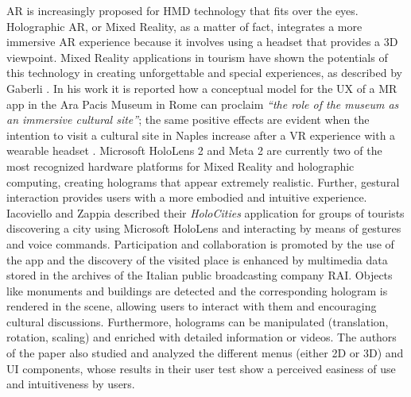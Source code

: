 AR is increasingly proposed for \gls{HMD} technology that fits over the eyes. Holographic AR, or Mixed Reality, as a matter of fact, integrates a more immersive AR experience because it involves using a headset that provides a 3D viewpoint.
Mixed Reality applications in tourism have shown the potentials of this technology in creating unforgettable and special experiences, as described by Gaberli \cite{gaberli_tourism_2019}. In his work it is reported how a conceptual model for the UX of a MR app in the Ara Pacis Museum \cite{jung_impact_2020} in Rome can proclaim \textit{“the role of the museum as an immersive cultural site”}; the same positive effects are evident when the intention to visit a cultural site in Naples increase after a VR experience with a wearable headset \cite{marasco_exploring_2018}.
Microsoft HoloLens 2 and Meta 2 are currently two of the most recognized hardware platforms for Mixed Reality and holographic computing, creating holograms that appear extremely realistic. Further, gestural interaction provides users with a more embodied and intuitive experience. 
Iacoviello and Zappia \cite{iacoviello_holocities_2020} described their \textit{HoloCities} application for groups of tourists discovering a city using Microsoft HoloLens and interacting by means of gestures and voice commands. Participation and collaboration is promoted by the use of the app and the discovery of the visited place is enhanced by multimedia data stored in the archives of the Italian public broadcasting company RAI. Objects like monuments and buildings are detected and the corresponding hologram is rendered in the scene, allowing users to interact with them and encouraging cultural discussions. Furthermore, holograms can be manipulated (translation, rotation, scaling) and enriched with detailed information or videos.
The authors of the paper also studied and analyzed the different menus (either 2D or 3D) and UI components, whose results in their user test show a perceived easiness of use and intuitiveness by users.

